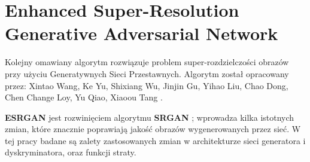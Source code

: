\chapter{Enhanced Super-Resolution Generative Adversarial Network}

Kolejny omawiany algorytm rozwiązuje problem super-rozdzielczości obrazów przy użyciu Generatywnych Sieci Przestawnych. Algorytm został opracowany przez: Xintao Wang, Ke Yu, Shixiang Wu, Jinjin Gu, Yihao Liu,
Chao Dong, Chen Change Loy, Yu Qiao, Xiaoou Tang \cite{wang2018esrgan}.

\textbf{ESRGAN} jest rozwinięciem algorytmu \textbf{SRGAN} \cite{Ledig_2017_CVPR}; wprowadza kilka istotnych zmian, które znacznie poprawiają jakość obrazów wygenerowanych przez sieć. W tej pracy badane są zalety zastosowanych zmian w architekturze sieci generatora i dyskryminatora, oraz funkcji straty. 


